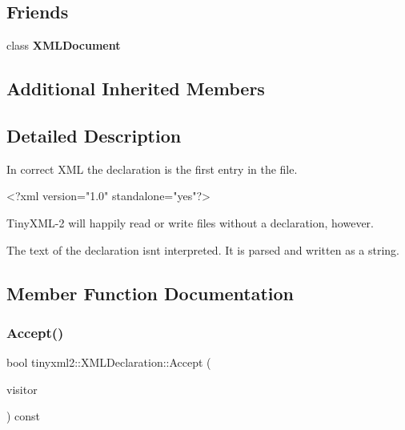 \subsection*{Friends}
\begin{DoxyCompactItemize}
\item 
\mbox{\label{classtinyxml2_1_1_x_m_l_declaration_a4eee3bda60c60a30e4e8cd4ea91c4c6e}} 
class {\bfseries X\+M\+L\+Document}
\end{DoxyCompactItemize}
\subsection*{Additional Inherited Members}


\subsection{Detailed Description}
In correct X\+ML the declaration is the first entry in the file. \begin{DoxyVerb}    <?xml version="1.0" standalone="yes"?>
\end{DoxyVerb}


Tiny\+X\+M\+L-\/2 will happily read or write files without a declaration, however.

The text of the declaration isn\textquotesingle{}t interpreted. It is parsed and written as a string. 

\subsection{Member Function Documentation}
\mbox{\label{classtinyxml2_1_1_x_m_l_declaration_acf47629d9fc08ed6f1c164a97bcf794b}} 
\subsubsection{\texorpdfstring{Accept()}{Accept()}}
{\footnotesize\ttfamily bool tinyxml2\+::\+X\+M\+L\+Declaration\+::\+Accept (\begin{DoxyParamCaption}\item[{\hyperlink{classtinyxml2_1_1_x_m_l_visitor}{X\+M\+L\+Visitor} $\ast$}]{visitor }\end{DoxyParamCaption}) const\hspace{0.3cm}{\ttfamily [virtual]}}

